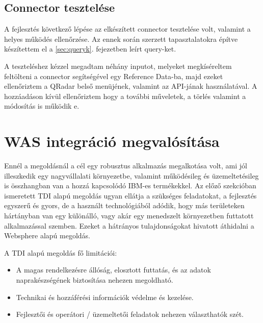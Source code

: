 \subsection{Connector tesztelése}
A fejlesztés következő lépése az elkészített connector tesztelése volt, valamint a helyes működés ellenőrzése. Az ennek során szerzett tapasztalatokra építve készítettem el a \ref{sec:queryk}.  fejezetben leírt query-ket.

A teszteléshez kézzel megadtam néhány inputot, melyeket megkíséreltem feltölteni a connector segítségével egy Reference Data-ba, majd ezeket ellenőriztem a QRadar belső menüjének, valamint az API-jának használatával. 
A hozzáadáson kívül ellenőriztem hogy a további műveletek, a törlés valamint a módosítás is működik e.
\section{WAS integráció megvalósítása}

Ennél a megoldásnál a cél egy robusztus alkalmazás megalkotása volt, ami jól illeszkedik egy nagyvállalati környezetbe, valamint működésileg és üzemeltetésileg is összhangban van a hozzá kapcsolódó IBM-es termékekkel. Az előző szekcióban ismeretett TDI alapú megoldás ugyan ellátja a szükséges feladatokat, a fejlesztés egyszerű és gyors, de a használt technológiából adódik, hogy más területeken hártányban van egy különálló, vagy akár egy menedszelt környezetben futtatott alkalmazással szemben. Ezeket a hátrányos tulajdonságokat hivatott áthidalni a Websphere alapú megoldás.

A TDI alapú megoldás fő limitációi:
\begin{itemize}	
	\item \todo A magas rendelkezésre állóság, elosztott futtatás, és az adatok naprakészségének biztosítása nehezen megoldható.
	
	\item \todo Technikai és hozzáférési információk védelme és kezelése.
	
	\item Fejlesztői és operátori / üzemeltetői feladatok nehezen választhatók szét.
	
\end{itemize}

